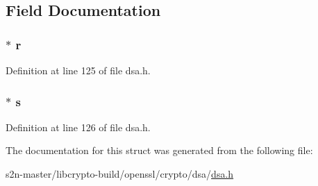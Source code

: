 \subsection{Field Documentation}
\subsubsection[{\texorpdfstring{r}{r}}]{$\ast$ r}\hypertarget{struct_d_s_a___s_i_g__st_acaf81cf110d1af000216b0bb5a57a919}{}\label{struct_d_s_a___s_i_g__st_acaf81cf110d1af000216b0bb5a57a919}


Definition at line 125 of file dsa.\+h.

\subsubsection[{\texorpdfstring{s}{s}}]{$\ast$ s}\hypertarget{struct_d_s_a___s_i_g__st_ad4f6d96b398878d2c1dfc2b458a61b22}{}\label{struct_d_s_a___s_i_g__st_ad4f6d96b398878d2c1dfc2b458a61b22}


Definition at line 126 of file dsa.\+h.



The documentation for this struct was generated from the following file\+:\begin{DoxyCompactItemize}
\item 
s2n-\/master/libcrypto-\/build/openssl/crypto/dsa/\hyperlink{dsa_8h}{dsa.\+h}\end{DoxyCompactItemize}
